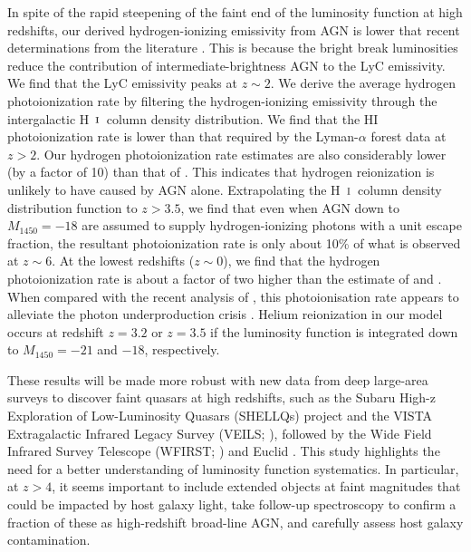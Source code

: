 \documentclass[fleqn,usenatbib]{mnras}
\def\HI{\hbox{H~$\scriptstyle\rm I$}}
\begin{document}
In spite of the rapid steepening of the faint end of the luminosity
function at high redshifts, our derived hydrogen-ionizing emissivity
from AGN is lower that recent determinations from the literature
\citep{2015AA...578A..83G}.  This is because the bright break
luminosities reduce the contribution of intermediate-brightness AGN to
the LyC emissivity.  We find that the LyC emissivity peaks at $z\sim
2$.  We derive the average hydrogen photoionization rate by filtering
the hydrogen-ionizing emissivity through the intergalactic \HI\ column
density distribution.  We find that the HI photoionization rate is
lower than that required by the Lyman-$\alpha$ forest data at $z>2$.
Our hydrogen photoionization rate estimates are also considerably
lower (by a factor of 10) than that of \citet{2015AA...578A..83G}.
This indicates that hydrogen reionization is unlikely to have caused
by AGN alone.  Extrapolating the \HI\ column density distribution
function to $z>3.5$, we find that even when AGN down to $M_{1450}=-18$
are assumed to supply hydrogen-ionizing photons with a unit escape
fraction, the resultant photoionization rate is only about 10\% of
what is observed at $z\sim 6$.  At the lowest redshifts ($z\sim 0$),
we find that the hydrogen photoionization rate is about a factor of
two higher than the estimate of \citet{2007ApJ...654..731H} and
\citet{2012ApJ...746..125H}.  When compared with the recent analysis
of \citet{2017MNRAS.467.3172G}, this photoionisation rate appears to
alleviate the photon underproduction crisis
\citep{2014ApJ...789L..32K}.  Helium reionization in our model occurs
at redshift $z=3.2$ or $z=3.5$ if the luminosity function is
integrated down to $M_{1450}=-21$ and $-18$, respectively.

These results will be made more robust with new data from deep
large-area surveys to discover faint quasars at high redshifts, such
as the Subaru High-z Exploration of Low-Luminosity Quasars (SHELLQs)
project \citep{2016ApJ...828...26M} and the VISTA Extragalactic
Infrared Legacy Survey (VEILS; \citealt{2017MNRAS.464.1693H}),
followed by the Wide Field Infrared Survey Telescope (WFIRST;
\citealt{2013arXiv1305.5422S}) and Euclid \citep{2011arXiv1110.3193L}.
This study highlights the need for a better understanding of
luminosity function systematics.  In particular, at $z>4$, it seems
important to include extended objects at faint magnitudes that could
be impacted by host galaxy light, take follow-up spectroscopy to
confirm a fraction of these as high-redshift broad-line AGN, and
carefully assess host galaxy contamination.
\end{document}
